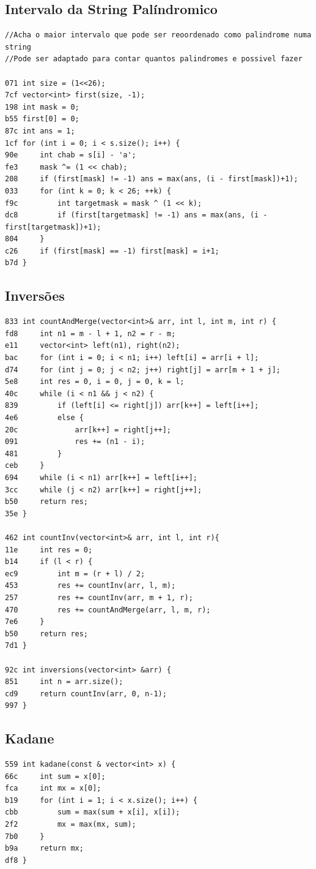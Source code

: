 \documentclass[11pt, a4paper, twoside]{article}
\begin{document}
{\subsection{Intervalo da String Palíndromico}
\begin{lstlisting}
//Acha o maior intervalo que pode ser reoordenado como palindrome numa string
//Pode ser adaptado para contar quantos palindromes e possivel fazer 

071 int size = (1<<26);
7cf vector<int> first(size, -1);
198 int mask = 0;
b55 first[0] = 0;
87c int ans = 1;
1cf for (int i = 0; i < s.size(); i++) {
90e     int chab = s[i] - 'a';
fe3     mask ^= (1 << chab);
208     if (first[mask] != -1) ans = max(ans, (i - first[mask])+1);
033     for (int k = 0; k < 26; ++k) {
f9c         int targetmask = mask ^ (1 << k);
dc8         if (first[targetmask] != -1) ans = max(ans, (i - first[targetmask])+1);
804     }
c26     if (first[mask] == -1) first[mask] = i+1;
b7d }
\end{lstlisting}

\subsection{Inversões}
\begin{lstlisting}
833 int countAndMerge(vector<int>& arr, int l, int m, int r) {
fd8     int n1 = m - l + 1, n2 = r - m;
e11     vector<int> left(n1), right(n2);
bac     for (int i = 0; i < n1; i++) left[i] = arr[i + l];
d74     for (int j = 0; j < n2; j++) right[j] = arr[m + 1 + j];
5e8     int res = 0, i = 0, j = 0, k = l;
40c     while (i < n1 && j < n2) {
839         if (left[i] <= right[j]) arr[k++] = left[i++];
4e6         else {
20c             arr[k++] = right[j++];
091             res += (n1 - i);
481         }
ceb     }
694     while (i < n1) arr[k++] = left[i++];
3cc     while (j < n2) arr[k++] = right[j++];
b50     return res;
35e }

462 int countInv(vector<int>& arr, int l, int r){
11e     int res = 0;
b14     if (l < r) {
ec9         int m = (r + l) / 2;
453         res += countInv(arr, l, m);
257         res += countInv(arr, m + 1, r);
470         res += countAndMerge(arr, l, m, r);
7e6     }
b50     return res;
7d1 }

92c int inversions(vector<int> &arr) {
851   	int n = arr.size();
cd9   	return countInv(arr, 0, n-1);
997 }
\end{lstlisting}

\subsection{Kadane}
\begin{lstlisting}
559 int kadane(const & vector<int> x) {
66c 	int sum = x[0];
fca 	int mx = x[0];
b19 	for (int i = 1; i < x.size(); i++) {
cbb 		sum = max(sum + x[i], x[i]);
2f2 		mx = max(mx, sum);
7b0 	}
b9a 	return mx;
df8 }


\end{lstlisting}}
\end{document}
